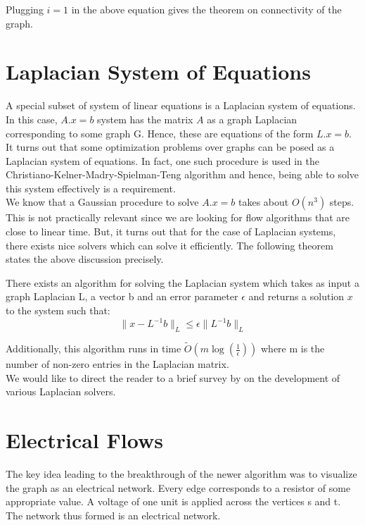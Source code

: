 \documentclass[BTech]{iitmdiss}
\begin{document}
		Plugging $i=1$ in the above equation gives the theorem on connectivity of the graph. \\
		
		\section{Laplacian System of Equations}
		  A special subset of system of linear equations is a Laplacian system of equations. In this case, $A.x = b$ system has the matrix 
		  $A$ as a graph Laplacian corresponding to some graph G. Hence, these are equations of the form $L.x = b$. It turns out that some 
		  optimization problems over graphs can be posed as a Laplacian system of equations. In fact, one such procedure is used in the 
		  Christiano-Kelner-Madry-Spielman-Teng algorithm and hence, being able to solve this system effectively is a requirement. \\
		  
		  We know that a Gaussian procedure to solve $A.x = b$ takes about $O(n^3)$ steps. This is not practically relevant since we are 
		  looking for flow algorithms that are close to linear time. But, it turns out that for the case of Laplacian systems, there exists 
		  nice solvers which can solve it efficiently. The following theorem states the above discussion precisely. \\
		  
		  \begin{thm}
		    There exists an algorithm for solving the Laplacian system which takes as input a graph Laplacian L, a vector b and an error parameter
		    $\epsilon$ and returns a solution $x$ to the system such that:
		    $$\|x - L^{-1}b \|_L \leq \epsilon \|L^{-1}b\|_L$$
		  \end{thm}
		    
		    Additionally, this algorithm runs in time $\tilde{O}(m \log(\frac{1}{\epsilon}))$ where m is the number of non-zero entries in the 
		    Laplacian matrix. \\
		    
		    We would like to direct the reader to a brief survey by \cite{olivia} on the development of various 
		    Laplacian solvers.
		    
		    \section{Electrical Flows}
		      The key idea leading to the breakthrough of the newer algorithm was to visualize the graph as an electrical network. Every
		      edge corresponds to a resistor of some appropriate value. A voltage of
		      one unit is applied across the vertices s and t. The network thus formed is an electrical network. \\
		      
\end{document}
